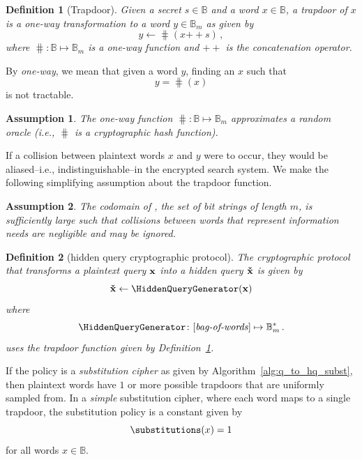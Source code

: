 \documentclass[final,11pt]{article}
\newcommand{\hqb}[1][]{%
   \ifthenelse{ \equal{#1}{} }
      {\ensuremath{\vec{\check{x}}}}
      {\ensuremath{\vec{\check{x}_{#1}}}}
}
\newcommand{\qb}[1][]{%
   \ifthenelse{ \equal{#1}{} }
      {\ensuremath{\vec{x}}}
      {\ensuremath{\vec{x_{#1}}}}
}
\newcommand{\catop}{{+\!\!+}}
\renewcommand{\vec}[1]{\boldsymbol{\mathbf{#1}}}
\newcommand{\cisb}{\mathbb{B}}
\numberwithin{equation}{section}
\theoremstyle{plain}
\newtheorem{definition}{Definition}[section]
\newtheorem{assumption}{Assumption}[section]
\theoremstyle{remark}
\begin{document}
\begin{definition}[Trapdoor]
\label{def:trapdoorfunc}
Given a secret $s \in \cisb$ and a word $x \in \cisb$, a trapdoor of $x$ is a \emph{one-way} transformation to a word $y \in \cisb_m$ as given by
\begin{equation}
    y \gets \hash(x \catop s)\,,
\end{equation}
where $\hash \colon \cisb \mapsto \cisb_m$ is a \emph{one-way} function and $\catop$ is the concatenation operator.
\end{definition}
By \emph{one-way}, we mean that given a word $y$, finding an $x$ such that
\begin{equation*}
    y = \hash(x)
\end{equation*}
is not tractable.
\begin{assumption}
\label{asm:trapdoor}
The one-way function $\hash \colon \cisb \mapsto \cisb_m$ approximates a random oracle (i.e., $\hash$ is a cryptographic hash function).
\end{assumption}
If a collision between plaintext words $x$ and $y$ were to occur, they would be aliased--i.e., indistinguishable--in the encrypted search system. We make the following simplifying assumption about the trapdoor function.
\begin{assumption}
The codomain of \hash, the set of bit strings of length $m$, is sufficiently large such that collisions between words that represent information needs are negligible and may be ignored.
\end{assumption}

\begin{definition}[hidden query cryptographic protocol]
\label{def:hq_prot}
The cryptographic protocol that transforms a plaintext query $\qb$ into a hidden query $\hqb$ is given by
\begin{equation}
    \hqb \gets \HiddenQueryGenerator\!\left(\qb\right)
\end{equation}
where 
\begin{equation}
    \HiddenQueryGenerator \colon [\text{\emph{bag-of-words}}] \mapsto \cisb_m^*\,.
\end{equation}
uses the trapdoor function given by Definition~\ref{def:trapdoorfunc}.
\end{definition}

If the policy is a \emph{substitution cipher} as given by Algorithm~\ref{alg:q_to_hq_subst}, then plaintext words have $1$ or more possible trapdoors that are uniformly sampled from. In a \emph{simple} substitution cipher, where each word maps to a single trapdoor, the substitution policy is a constant given by
\begin{equation}
    \substitutions(x) = 1
\end{equation}
for all words $x \in \cisb$.
\end{document}
